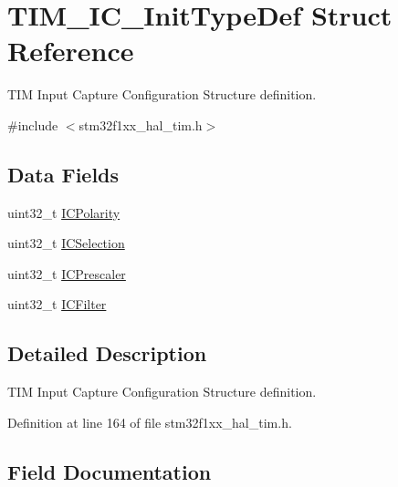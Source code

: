 \hypertarget{struct_t_i_m___i_c___init_type_def}{}\section{T\+I\+M\+\_\+\+I\+C\+\_\+\+Init\+Type\+Def Struct Reference}
\label{struct_t_i_m___i_c___init_type_def}


T\+IM Input Capture Configuration Structure definition.  




{\ttfamily \#include $<$stm32f1xx\+\_\+hal\+\_\+tim.\+h$>$}

\subsection*{Data Fields}
\begin{DoxyCompactItemize}
\item 
uint32\+\_\+t \hyperlink{struct_t_i_m___i_c___init_type_def_a6c0364c24e89f17849b0109236112fba}{I\+C\+Polarity}
\item 
uint32\+\_\+t \hyperlink{struct_t_i_m___i_c___init_type_def_a280cec08ad0ea4608ae57523775cc1c0}{I\+C\+Selection}
\item 
uint32\+\_\+t \hyperlink{struct_t_i_m___i_c___init_type_def_adc795cd98eeaa7725743856652cd2b4a}{I\+C\+Prescaler}
\item 
uint32\+\_\+t \hyperlink{struct_t_i_m___i_c___init_type_def_ab621c1517d5345834fcc71eea97156bf}{I\+C\+Filter}
\end{DoxyCompactItemize}


\subsection{Detailed Description}
T\+IM Input Capture Configuration Structure definition. 

Definition at line 164 of file stm32f1xx\+\_\+hal\+\_\+tim.\+h.



\subsection{Field Documentation}
\mbox{\label{struct_t_i_m___i_c___init_type_def_ab621c1517d5345834fcc71eea97156bf}} 
